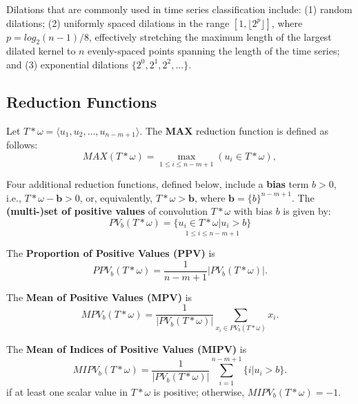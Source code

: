 Dilations that are commonly used in time series classification include: (1) random dilations; (2) uniformly spaced dilations in the range $[1, \lfloor 2^p \rfloor]$, where $p = log_2(n-1)/8$, effectively stretching the maximum length of the largest dilated kernel to $n$ evenly-spaced points spanning the length of the time series; and (3) exponential dilations $\{2^0, 2^1, 2^2, \ldots \}$.

\subsection{Reduction Functions}
\label{sec:Reductions}

Let $T * \omega = \langle u_1, u_2, \ldots, u_{n-m+1} \rangle$. The \textbf{MAX} reduction function is defined as follows:
\begin{equation}
    MAX(T*\omega) = \max\limits_{1 \leq i \leq n-m+1}(u_i \in T*\omega),
    \label{eq:max}
\end{equation}

Four additional reduction functions, defined below, include a \textbf{bias} term $b > 0$, i.e., $T * \omega - \textbf{b} > 0$, or, equivalently, $T * \omega > \textbf{b}$, where $\textbf{b} = \{b\}^{n-m+1}$. The \textbf{(multi-)set of positive values} of convolution $T * \omega$ with bias $b$ is given by:
\begin{equation}
    PV_b(T * \omega) = \underset{1 \leq i \leq n-m+1}{\{ u_i \in T*\omega|u_i > b \}}
    \label{eq:pv}
\end{equation}

The \textbf{Proportion of Positive Values (PPV)} is
\begin{equation}
    PPV_b(T*\omega) =\frac{1}{n-m+1}\biggl| PV_b(T*\omega)\biggr|.
    \label{eq:ppv}
\end{equation}

The \textbf{Mean of Positive Values (MPV)} is
\begin{equation}
    MPV_b(T*\omega) =\frac{1}{|PV_b(T*\omega)|}\sum_{x_i\in PV_b(T*\omega)} x_i.
    \label{eq:mpv}
\end{equation}


The \textbf{Mean of Indices of Positive Values (MIPV)} is
\begin{equation}
    MIPV_b(T*\omega) = \frac{1}{|PV_b(T*\omega)|}\sum_{i=1}^{n-m+1}\{i|u_i > b\}. 
    \label{eq:mipv}
\end{equation}
if at least one scalar value in $T*\omega$ is positive; otherwise, $MIPV_b(T*\omega) = -1$.

